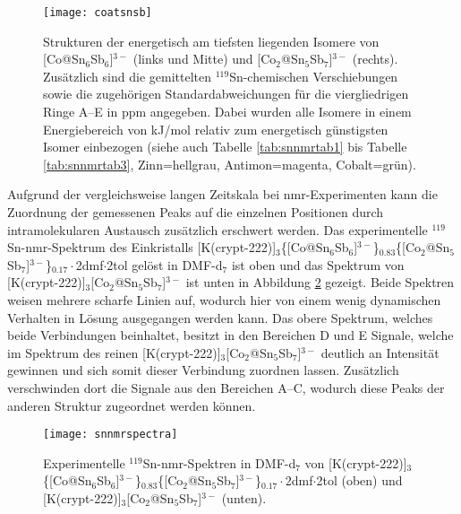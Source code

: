 \begin{figure}[ht!]
	\centering
	\texttt{[image: coatsnsb]}
	\captionsetup{figurewithin = chapter}
	\captionsetup{font=small, labelfont=bf}\caption[Strukturen von {[Co@Sn$_6$Sb$_6$]$^{3-}$ und [Co$_2$@Sn$_5$Sb$_7$]$^{3-}$}]{Strukturen der energetisch am tiefsten liegenden Isomere von [Co@Sn$_6$Sb$_6$]$^{3-}$ (links und Mitte) und [Co$_2$@Sn$_5$Sb$_7$]$^{3-}$ (rechts). Zusätzlich sind die gemittelten $^{119}$Sn-chemischen Verschiebungen sowie die zugehörigen Standardabweichungen für die viergliedrigen Ringe A--E in ppm angegeben. Dabei wurden alle Isomere in einem Energiebereich von \unit[10]{kJ/mol} relativ zum energetisch günstigsten Isomer einbezogen (siehe auch Tabelle \ref{tab:snnmrtab1} bis Tabelle \ref{tab:snnmrtab3}, Zinn=hellgrau, Antimon=magenta, Cobalt=grün).}
\label{abb:coatsnsb}
\end{figure}
\FloatBarrier
Aufgrund der vergleichsweise langen Zeitskala bei \ac{nmr}-Experimenten kann die Zuordnung der gemessenen Peaks auf die einzelnen Positionen durch intramolekularen Austausch zusätzlich erschwert werden. Das experimentelle $^{119}$Sn-\ac{nmr}-Spektrum des Einkristalls [K(crypt-222)]$_3$\{[Co@Sn$_6$Sb$_6$]$^{3-}$\}$_{0.83}$\{[Co$_2$@Sn$_5$Sb$_7$]$^{3-}$\}$_{0.17}\cdot$2dmf$\cdot$2tol gelöst in DMF-d$_7$ ist oben und das Spektrum von [K(crypt-222)]$_3$[Co$_2$@Sn$_5$Sb$_7$]$^{3-}$ ist unten in Abbildung \ref{abb:expsnnmr} gezeigt. Beide Spektren weisen mehrere scharfe Linien auf, wodurch hier von einem wenig dynamischen Verhalten in Lösung ausgegangen werden kann. Das obere Spektrum, welches beide Verbindungen beinhaltet, besitzt in den Bereichen D und E Signale, welche im Spektrum des reinen [K(crypt-222)]$_3$[Co$_2$@Sn$_5$Sb$_7$]$^{3-}$ deutlich an Intensität gewinnen und sich somit dieser Verbindung zuordnen lassen. Zusätzlich verschwinden dort die Signale aus den Bereichen A--C, wodurch diese Peaks der anderen Struktur zugeordnet werden können. 
\begin{figure}[ht!]
	\centering
	\texttt{[image: snnmrspectra]}
	\captionsetup{figurewithin = chapter}
	\captionsetup{font=small, labelfont=bf}\caption[{$^{119}$Sn-\ac{nmr}-Spektren von [Co@Sn$_6$Sb$_6$]$^{3-}$ und [Co$_2$@Sn$_5$Sb$_7$]$^{3-}$}]{Experimentelle $^{119}$Sn-\ac{nmr}-Spektren in DMF-d$_7$ von [K(crypt-222)]$_3$\{[Co@Sn$_6$Sb$_6$]$^{3-}$\}$_{0.83}$\{[Co$_2$@Sn$_5$Sb$_7$]$^{3-}$\}$_{0.17}\cdot$2dmf$\cdot$2tol (oben) und [K(crypt-222)]$_3$[Co$_2$@Sn$_5$Sb$_7$]$^{3-}$ (unten).}
\label{abb:expsnnmr}
\end{figure}
\FloatBarrier

